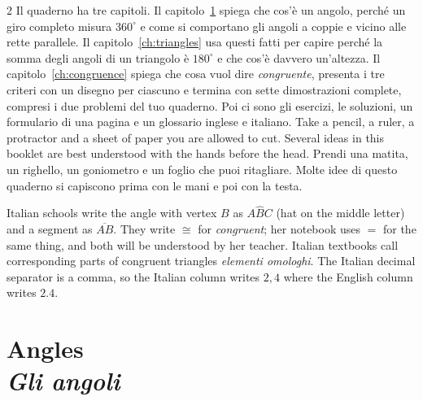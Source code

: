 \documentclass[10pt,a4paper,oneside]{book}
\newif\ifIT
\newenvironment{bi}%
  {\begin{paracol}{2}\global\ITfalse\selectlanguage{english}}%
  {\end{paracol}}
\newcommand{\IT}{\switchcolumn\global\ITtrue\selectlanguage{italian}}
\newcommand{\EN}{\switchcolumn*\global\ITfalse\selectlanguage{english}}
\newcommand{\bichapter}[2]{%
  \chapter[#1 \textperiodcentered\ #2]{#1\\[2pt]{\color{itgreen}\itshape #2}}}
\newcommand{\ang}[3]{#1\widehat{#2}#3}      %
\newcommand{\seg}[1]{\overline{#1}}         %
\begin{document}
\begin{bi}
\IT
Il quaderno ha tre capitoli. Il capitolo~\ref{ch:angles} spiega che cos'è un angolo, perché un giro completo misura $360^\circ$ e come si comportano gli angoli a coppie e vicino alle rette parallele. Il capitolo~\ref{ch:triangles} usa questi fatti per capire perché la somma degli angoli di un triangolo è $180^\circ$ e che cos'è davvero un'altezza. Il capitolo~\ref{ch:congruence} spiega che cosa vuol dire \emph{congruente}, presenta i tre criteri con un disegno per ciascuno e termina con sette dimostrazioni complete, compresi i due problemi del tuo quaderno. Poi ci sono gli esercizi, le soluzioni, un formulario di una pagina e un glossario inglese e italiano.
\EN
Take a pencil, a ruler, a protractor and a sheet of paper you are allowed to cut. Several ideas in this booklet are best understood with the hands before the head.
\IT
Prendi una matita, un righello, un goniometro e un foglio che puoi ritagliare. Molte idee di questo quaderno si capiscono prima con le mani e poi con la testa.
\end{bi}

\begin{tutor}[notation]
Italian schools write the angle with vertex $B$ as $\ang{A}{B}{C}$ (hat on the middle letter) and a segment as $\seg{AB}$. They write $\cong$ for \emph{congruent}; her notebook uses $=$ for the same thing, and both will be understood by her teacher. Italian textbooks call corresponding parts of congruent triangles \emph{elementi omologhi}. The Italian decimal separator is a comma, so the Italian column writes $2{,}4$ where the English column writes $2.4$.
\end{tutor}

\tableofcontents

\mainmatter
\bichapter{Angles}{Gli angoli}\label{ch:angles}
\end{document}

